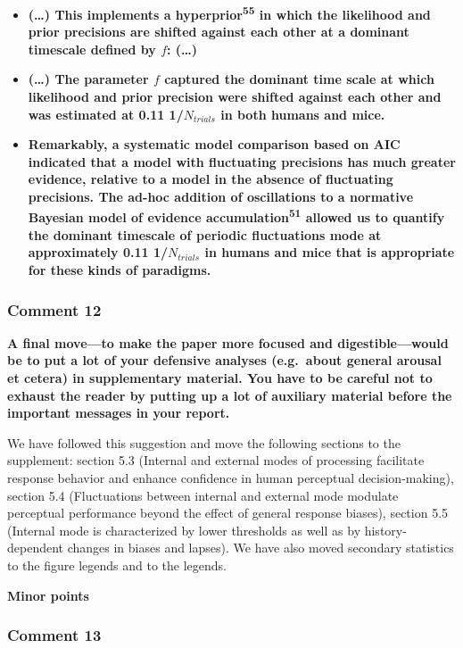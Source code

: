 \documentclass[
]{article}
\begin{document}
\begin{itemize}
\item
  \textbf{(\ldots) This implements a hyperprior\textsuperscript{55} in
  which the likelihood and prior precisions are shifted against each
  other at a dominant timescale defined by \(f\): (\ldots)}
\item
  \textbf{(\ldots) The parameter \(f\) captured the dominant time scale
  at which likelihood and prior precision were shifted against each
  other and was estimated at 0.11 1/\(N_{trials}\) in both humans and
  mice.}
\item
  \textbf{Remarkably, a systematic model comparison based on AIC
  indicated that a model with fluctuating precisions has much greater
  evidence, relative to a model in the absence of fluctuating
  precisions. The ad-hoc addition of oscillations to a normative
  Bayesian model of evidence accumulation\textsuperscript{51} allowed us
  to quantify the dominant timescale of periodic fluctuations mode at
  approximately 0.11 1/\(N_{trials}\) in humans and mice that is
  appropriate for these kinds of paradigms.}
\end{itemize}

\hypertarget{comment-12}{%
\subsubsection{Comment 12}\label{comment-12}}

\textbf{A final move---to make the paper more focused and
digestible---would be to put a lot of your defensive analyses
(e.g.~about general arousal et cetera) in supplementary material. You
have to be careful not to exhaust the reader by putting up a lot of
auxiliary material before the important messages in your report.}

We have followed this suggestion and move the following sections to the
supplement: section 5.3 (Internal and external modes of processing
facilitate response behavior and enhance confidence in human perceptual
decision-making), section 5.4 (Fluctuations between internal and
external mode modulate perceptual performance beyond the effect of
general response biases), section 5.5 (Internal mode is characterized by
lower thresholds as well as by history-dependent changes in biases and
lapses). We have also moved secondary statistics to the figure legends
and to the legends.

\textbf{Minor points}

\hypertarget{comment-13}{%
\subsubsection{Comment 13}\label{comment-13}}
\end{document}
